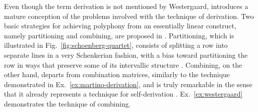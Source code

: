 Even though the term derivation is not mentioned by Westergaard, \cite{Westergaard1966} introduces a mature conception of the problems involved with the technique of derivation. Two basic strategies for achieving polyphony from an essentially linear construct, namely partitioning and combining, are proposed in \cite[95]{Westergaard1966}. Partitioning, which is illustrated in Fig.~\ref{fig:schoenberg-quartet}, consists of splitting a row into separate lines in a very Schenkerian fashion, with a bias toward partitioning the row in ways that preserve some of its intervallic structure \cite[100]{Westergaard1966}. Combining, on the other hand, departs from combination matrices, similarly to the technique demonstrated in Ex.~\ref{ex:martino-derivation}, and is truly remarkable in the sense that it already represents a technique for self-derivation \cite[101]{Westergaard1966}. Ex.~\ref{ex:westergaard} demonstrates the technique of combining.

